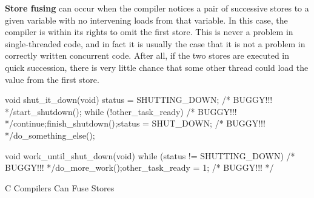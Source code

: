 {\bf Store fusing} can occur when the compiler notices a pair of successive
stores to a given variable with no intervening loads from that variable.
In this case, the compiler is within its rights to omit the first store.
This is never a problem in single-threaded code, and in fact it is usually
the case that it is not a problem in correctly written concurrent code.
After all, if the two stores are executed in quick succession, there is
very little chance that some other thread could load the value from the
first store.

\begin{listing}[tbp]
\begin{linelabel}
\begin{VerbatimL}[commandchars=\\\[\]]
void shut_it_down(void)
{
	status = SHUTTING_DOWN; /* BUGGY!!! */\lnlbl[store:a]
	start_shutdown();
	while (!other_task_ready) /* BUGGY!!! */\lnlbl[loop:b]
		continue;\lnlbl[loop:e]
	finish_shutdown();\lnlbl[finish]
	status = SHUT_DOWN; /* BUGGY!!! */\lnlbl[store:b]
	do_something_else();
}

void work_until_shut_down(void)
{
	while (status != SHUTTING_DOWN) /* BUGGY!!! */
		do_more_work();
	other_task_ready = 1; /* BUGGY!!! */
}
\end{VerbatimL}
\end{linelabel}
\caption{C Compilers Can Fuse Stores}
\label{lst:toolsoftrade:C Compilers Can Fuse Stores}
\end{listing}

